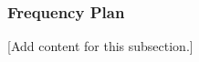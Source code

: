 
\subsubsection{Frequency Plan}
\label{subsubsec:design_5_2_frequency_plan}

[Add content for this subsection.]

